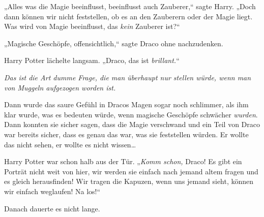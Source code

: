 „Alles was die Magie beeinflusst, beeinflusst auch Zauberer,“ sagte Harry. „Doch dann können wir nicht feststellen, ob es an den Zauberern oder der Magie liegt. Was wird von Magie beeinflusst, das \emph{kein} Zauberer ist?“

„Magische Geschöpfe, offensichtlich,“ sagte Draco ohne nachzudenken.

Harry Potter lächelte langsam. „Draco, das ist \emph{brillant.}“

\emph{Das ist die Art dumme Frage, die man überhaupt nur stellen würde, wenn man von Muggeln aufgezogen worden ist.}

Dann wurde das saure Gefühl in Dracos Magen sogar noch schlimmer, als ihm klar wurde, was es bedeuten würde, wenn magische Geschöpfe schwächer \emph{wurden}. Dann konnten sie sicher sagen, dass die Magie verschwand und ein Teil von Draco war bereits sicher, dass es genau das war, was sie feststellen würden. Er wollte das nicht sehen, er wollte es nicht wissen…

Harry Potter war schon halb aus der Tür. „\emph{Komm schon,} Draco! Es gibt ein Porträt nicht weit von hier, wir werden sie einfach nach jemand altem fragen und es gleich herausfinden! Wir tragen die Kapuzen, wenn uns jemand sieht, können wir einfach weglaufen! Na los!“

\later

Danach dauerte es nicht lange.

